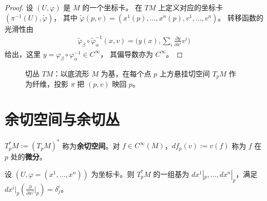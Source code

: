 \begin{proof}
设 $(U, \varphi)$ 是 $M$ 的一个坐标卡。
在 $TM$ 上定义对应的坐标卡 $(\pi^{-1}(U), \tilde{\varphi})$，
其中
$\tilde{\varphi}(p, v) = (x^1(p), \dots, x^n(p), v^1, \dots, v^n)$。
转移函数的光滑性由
\[
\begin{aligned}
  \tilde{\varphi}_\beta \circ \tilde{\varphi}_\alpha^{-1}(x, v)
  = \bigl(y(x), \sum_i \tfrac{\partial y}{\partial x^i} v^i\bigr)
\end{aligned}
\]
给出，这里 $y = \varphi_\beta \circ \varphi_\alpha^{-1} \in C^\infty$，
其偏导数亦为 $C^\infty$。
\end{proof}

\begin{figure}[htbp]
\centering
{}
\caption{切丛 $TM$：以底流形 $M$ 为基，在每个点 $p$ 上方悬挂切空间 $T_pM$ 作为纤维，投影 $\pi$ 把 $(p,v)$ 映回 $p$。}
\label{fig:tangent_bundle}
\end{figure}

\section{余切空间与余切丛}

\begin{definition}[余切空间与微分]\label{def:cotangent_space}
$T_p^*M := (T_pM)^*$ 称为\textbf{余切空间}。对 $f \in C^\infty(M)$，$df_p(v) := v(f)$ 称为 $f$ 在 $p$ 处的\textbf{微分}。
\end{definition}

\begin{proposition}[余切空间的坐标基]\label{prop:cotangent_basis}
设 $(U, \varphi = (x^1, \dots, x^n))$ 为坐标卡。则 $T_p^*M$ 的一组基为 $dx^1|_p, \dots, dx^n|_p$，满足 $dx^i|_p(\frac{\partial}{\partial x^j}|_p) = \delta_j^i$。
\end{proposition}

